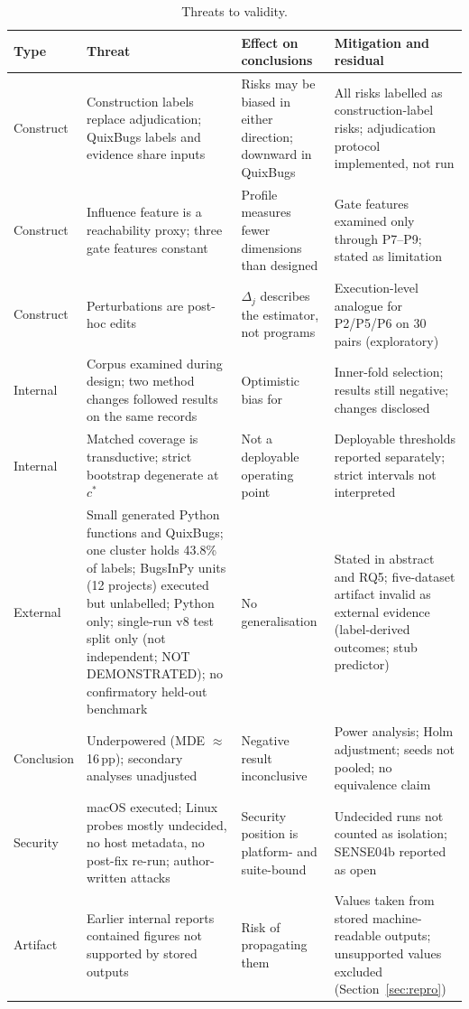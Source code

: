 \begin{table}[!t]
\caption{Threats to validity.}
\label{tab:threatsval}
\centering
\scriptsize
\setlength{\tabcolsep}{3pt}
\begin{tabular}{|L{1.6cm}|L{4.6cm}|L{4.4cm}|L{5.0cm}|}
\hline
Type & Threat & Effect on conclusions & Mitigation and residual \\
\hline
Construct & Construction labels replace adjudication; QuixBugs labels and evidence share inputs & Risks may be biased in either direction; downward in QuixBugs & All risks labelled as construction-label risks; adjudication protocol implemented, not run \\
Construct & Influence feature is a reachability proxy; three gate features constant & Profile measures fewer dimensions than designed & Gate features examined only through P7--P9; stated as limitation \\
Construct & Perturbations are post-hoc edits & $\Delta_j$ describes the estimator, not programs & Execution-level analogue for P2/P5/P6 on 30 pairs (exploratory) \\
Internal & Corpus examined during design; two method changes followed results on the same records & Optimistic bias for \sbg{} & Inner-fold selection; results still negative; changes disclosed \\
Internal & Matched coverage is transductive; strict bootstrap degenerate at $c^\ast$ & Not a deployable operating point & Deployable thresholds reported separately; strict intervals not interpreted \\
External & Small generated Python functions and QuixBugs; one cluster holds 43.8\% of labels; BugsInPy units (12 projects) executed but unlabelled; Python only; single-run v8 test split only (not independent; NOT DEMONSTRATED); no confirmatory held-out benchmark & No generalisation & Stated in abstract and RQ5; five-dataset artifact invalid as external evidence (label-derived outcomes; stub predictor) \\
Conclusion & Underpowered (MDE $\approx$16\,pp); secondary analyses unadjusted & Negative result inconclusive & Power analysis; Holm adjustment; seeds not pooled; no equivalence claim \\
Security & macOS executed; Linux probes mostly undecided, no host metadata, no post-fix re-run; author-written attacks & Security position is platform- and suite-bound & Undecided runs not counted as isolation; SENSE04b reported as open \\
Artifact & Earlier internal reports contained figures not supported by stored outputs & Risk of propagating them & Values taken from stored machine-readable outputs; unsupported values excluded (Section~\ref{sec:repro}) \\
\hline
\end{tabular}
\end{table}

